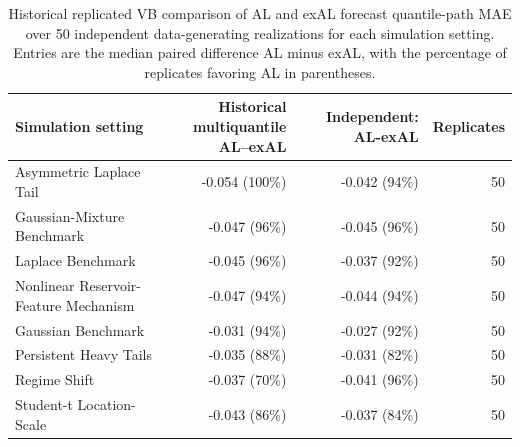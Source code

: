 \begin{table}[!htbp]
\centering
\scriptsize
\begin{tabular}{@{}>{\raggedright\arraybackslash}p{}rrr@{}}
\toprule
Simulation setting & \shortstack{Historical multiquantile\\AL--exAL} & Independent: AL-exAL & Replicates
\\
\midrule
Asymmetric Laplace Tail & -0.054 (100\%) & -0.042 (94\%) & 50 \\
Gaussian-Mixture Benchmark & -0.047 (96\%) & -0.045 (96\%) & 50 \\
Laplace Benchmark & -0.045 (96\%) & -0.037 (92\%) & 50 \\
Nonlinear Reservoir-Feature Mechanism & -0.047 (94\%) & -0.044 (94\%) & 50 \\
Gaussian Benchmark & -0.031 (94\%) & -0.027 (92\%) & 50 \\
Persistent Heavy Tails & -0.035 (88\%) & -0.031 (82\%) & 50 \\
Regime Shift & -0.037 (70\%) & -0.041 (96\%) & 50 \\
Student-t Location-Scale & -0.043 (86\%) & -0.037 (84\%) & 50 \\
\bottomrule
\end{tabular}
\caption{Historical replicated VB comparison of AL and exAL forecast quantile-path MAE over 50 independent data-generating realizations for each simulation setting. Entries are the median paired difference AL minus exAL, with the percentage of replicates favoring AL in parentheses.}
\label{tab:joint-qdesn-article-validation-phase153-replication-summary}
\end{table}
